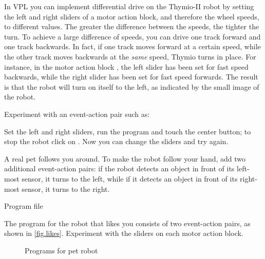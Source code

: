 In VPL you can implement differential drive on the Thymio-II robot by
setting the left and right sliders of a motor action block, and therefore the wheel speeds, to
different values.
The greater the difference between the speeds, the tighter the turn. To
achieve a large difference of speeds, you can drive one track forward
and one track backwards. In fact, if one track moves forward at a
certain speed, while the other track moves backwards at the \emph{same}
speed, Thymio turns in place.
For instance, in the motor action block , the left slider has
been set for fast speed backwards, while the right slider has been set
for fast speed forwards.
The result is that the robot will turn on itself to the left, as indicated by the small image of the robot.

Experiment with an event-action pair such as: 

Set the left and right sliders, run the program
and touch the center button; to stop the robot click on .
Now you can change the sliders and try again.




A real pet follows you around. To make the robot follow your hand, add
two additional event-action pairs: if the robot detects an object in
front of its left-most sensor, it turns to the left, while if it detects
an object in front of its right-most sensor, it turns to the right.

{\raggedleft \hfill Program file }

The program for the robot that likes you consists of two event-action pairs, as shown in \cref{fig.likes}.
Experiment with the sliders on each motor action block.

\begin{figure}
	\hfill
	\caption{Programs for pet robot}
\end{figure}


